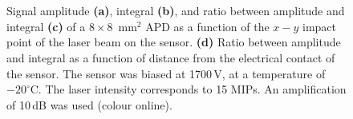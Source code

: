\documentclass[review,number,sort&compress]{elsarticle}
\begin{document}
\begin{figure}[h]
  \centering
  \hfill
  \\
  \hfill
  \\
  \caption{Signal amplitude {\bf (a)}, integral {\bf (b)}, and ratio between amplitude and integral {\bf (c)} of a $8 \times 8$~mm$^2$ APD as a function of the $x-y$ impact point of the laser beam on the sensor. {\bf (d)} Ratio between amplitude and integral as a function of distance from the electrical contact of the sensor. The sensor was biased at 1700\,V, at a temperature of $-20^\circ$C. The laser intensity corresponds to 15 MIPs. An amplification of 10\,dB was used (colour online).}
  \label{fig:8x8unif_noMetal}
\end{figure}
\end{document}
